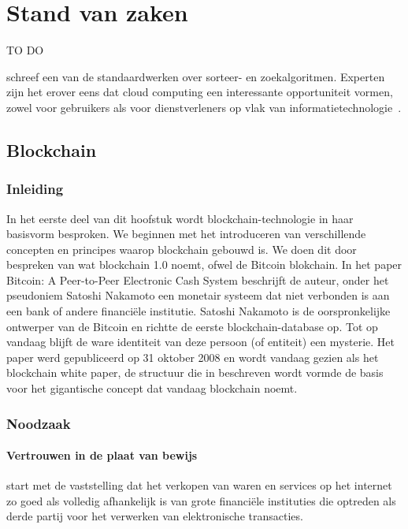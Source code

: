 \chapter{Stand van zaken}
\label{ch:stand-van-zaken}



TO DO

\textcite{Knuth1998} schreef een van de standaardwerken over sorteer- en zoekalgoritmen. Experten zijn het erover eens dat cloud computing een interessante opportuniteit vormen, zowel voor gebruikers als voor dienstverleners op vlak van informatietechnologie~\autocite{Creeger2009}.
\newpage
\section{Blockchain}
\label{sec:blockchain}
	\subsection*{Inleiding}
	In het eerste deel van dit hoofstuk wordt blockchain-technologie in haar basisvorm besproken. We beginnen met het introduceren  van  verschillende concepten en principes waarop blockchain gebouwd is.  We doen dit door bespreken van wat \textcite{Swan2015} blockchain 1.0 noemt, ofwel de Bitcoin blokchain. In het paper Bitcoin: A Peer-to-Peer Electronic Cash System beschrijft de auteur, onder het pseudoniem Satoshi Nakamoto een monetair systeem dat niet verbonden is aan een bank of  andere financiële institutie. Satoshi Nakamoto is de oorspronkelijke ontwerper van de Bitcoin en richtte de eerste blockchain-database op. Tot op vandaag blijft de ware identiteit van deze persoon (of entiteit) een mysterie. Het paper werd gepubliceerd op 31 oktober 2008 en wordt vandaag gezien als het blockchain white paper,  de structuur die in \textcite{Nakamoto2008} beschreven wordt vormde de basis voor het gigantische concept dat vandaag blockchain noemt.
	\subsection{Noodzaak}
			\subsubsection{Vertrouwen in de plaat van bewijs}
			\textcite{Nakamoto2008} start met de vaststelling dat het verkopen van waren en services op het internet zo goed als volledig afhankelijk is van grote financiële instituties die optreden als derde partij voor het verwerken van elektronische transacties. 
		
